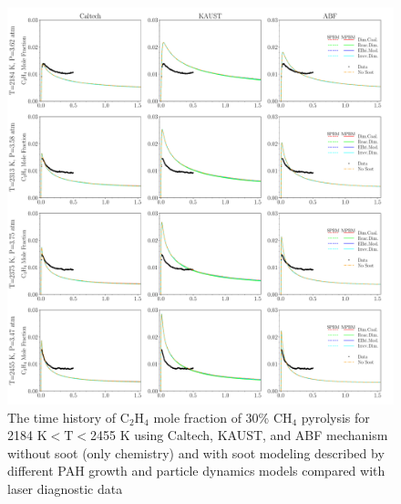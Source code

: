 \begin{figure}[H]
	\centering
	\includegraphics[width=1\textwidth]{Figures/Results/Shocktube/Stanford/june/30CH4_C2H4_mechs_s1.pdf}
	\caption{The time history of $\mathrm{C_2H_4}$ mole fraction of 30\% $\mathrm{CH_4}$ pyrolysis for 2184 K$<\mathrm{T}<$2455 K using Caltech, KAUST, and ABF mechanism without soot (only chemistry) and with soot modeling described by different PAH growth and particle dynamics models compared with laser diagnostic data}
	\label{fig:shocktubest_30ch4_c2h4_1} 
\end{figure}


